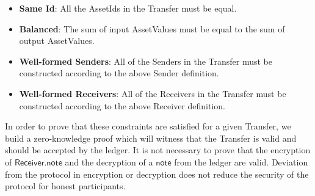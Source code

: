 \documentclass[a4paper]{article}
\theoremstyle{definition}
\newcommand{\AssetId}{{\textsf{AssetId}}}
\newcommand{\AssetValue}{{\textsf{AssetValue}}}
\newcommand{\Receiver}{{\textsf{Receiver}}}
\newcommand{\Sender}{{\textsf{Sender}}}
\newcommand{\Transfer}{{\textsf{Transfer}}}
\newcommand{\note}{{\textsf{note}}}
\begin{document}
\begin{itemize}
    \item \textbf{Same Id}: All the \AssetId{s} in the \Transfer{} must be equal.
    \item \textbf{Balanced}: The sum of input \AssetValue{s} must be equal to the sum of output \AssetValue{s}.
    \item \textbf{Well-formed Senders}: All of the \Sender{s} in the \Transfer{} must be constructed according to the above \Sender{} definition.
    \item \textbf{Well-formed Receivers}: All of the \Receiver{s} in the \Transfer{} must be constructed according to the above \Receiver{} definition.
\end{itemize}

In order to prove that these constraints are satisfied for a given \Transfer{}, we build a zero-knowledge proof which will witness that the \Transfer{} is valid and should be accepted by the ledger. It is not necessary to prove that the encryption of $\Receiver.\note$ and the decryption of a $\note$ from the ledger are valid. Deviation from the protocol in encryption or decryption does not reduce the security of the protocol for honest participants.
\end{document}
